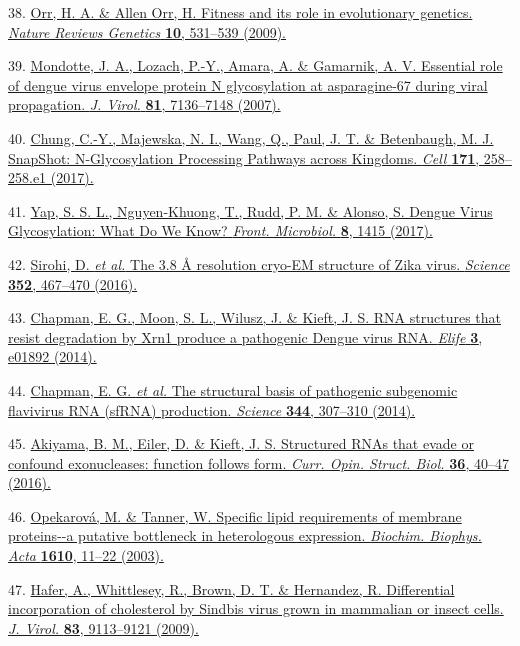 \documentclass[
]{article}
\begin{document}
38. \href{http://paperpile.com/b/REZjPf/WYtJW}{Orr, H. A. \& Allen Orr,
H. Fitness and its role in evolutionary genetics. \emph{Nature Reviews
Genetics} \textbf{10}, 531--539 (2009).}

39. \href{http://paperpile.com/b/REZjPf/hSNe}{Mondotte, J. A., Lozach,
P.-Y., Amara, A. \& Gamarnik, A. V. Essential role of dengue virus
envelope protein N glycosylation at asparagine-67 during viral
propagation. \emph{J. Virol.} \textbf{81}, 7136--7148 (2007).}

40. \href{http://paperpile.com/b/REZjPf/gTFia}{Chung, C.-Y., Majewska,
N. I., Wang, Q., Paul, J. T. \& Betenbaugh, M. J. SnapShot:
N-Glycosylation Processing Pathways across Kingdoms. \emph{Cell}
\textbf{171}, 258--258.e1 (2017).}

41. \href{http://paperpile.com/b/REZjPf/JUNqO}{Yap, S. S. L.,
Nguyen-Khuong, T., Rudd, P. M. \& Alonso, S. Dengue Virus Glycosylation:
What Do We Know? \emph{Front. Microbiol.} \textbf{8}, 1415 (2017).}

42. \href{http://paperpile.com/b/REZjPf/hrhvV}{Sirohi, D. \emph{et al.}
The 3.8 Å resolution cryo-EM structure of Zika virus. \emph{Science}
\textbf{352}, 467--470 (2016).}

43. \href{http://paperpile.com/b/REZjPf/Zs1LR}{Chapman, E. G., Moon, S.
L., Wilusz, J. \& Kieft, J. S. RNA structures that resist degradation by
Xrn1 produce a pathogenic Dengue virus RNA. \emph{Elife} \textbf{3},
e01892 (2014).}

44. \href{http://paperpile.com/b/REZjPf/b9GgS}{Chapman, E. G. \emph{et
al.} The structural basis of pathogenic subgenomic flavivirus RNA
(sfRNA) production. \emph{Science} \textbf{344}, 307--310 (2014).}

45. \href{http://paperpile.com/b/REZjPf/o9YCc}{Akiyama, B. M., Eiler, D.
\& Kieft, J. S. Structured RNAs that evade or confound exonucleases:
function follows form. \emph{Curr. Opin. Struct. Biol.} \textbf{36},
40--47 (2016).}

46. \href{http://paperpile.com/b/REZjPf/XAKft}{Opekarová, M. \& Tanner,
W. Specific lipid requirements of membrane proteins-\/-a putative
bottleneck in heterologous expression. \emph{Biochim. Biophys. Acta}
\textbf{1610}, 11--22 (2003).}

47. \href{http://paperpile.com/b/REZjPf/zRdX7}{Hafer, A., Whittlesey,
R., Brown, D. T. \& Hernandez, R. Differential incorporation of
cholesterol by Sindbis virus grown in mammalian or insect cells.
\emph{J. Virol.} \textbf{83}, 9113--9121 (2009).}
\end{document}
